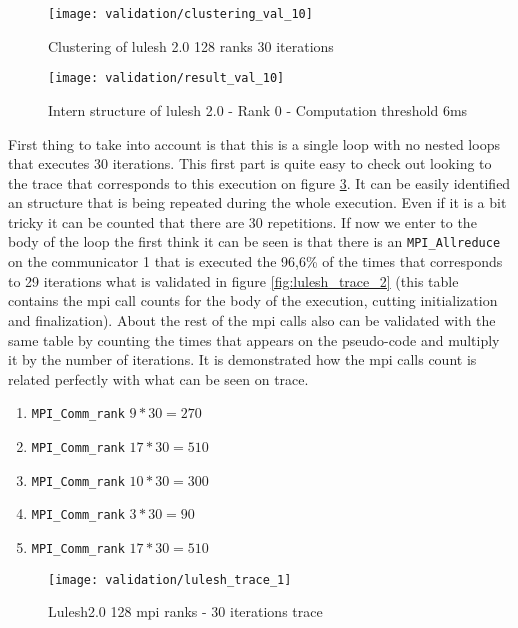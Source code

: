 \begin{figure}
  \centering
  \texttt{[image: validation/clustering\_val\_10]}
  \caption{Clustering of lulesh 2.0 128 ranks 30 iterations}
  \label{fig:clustering_val_10}
\end{figure}

\begin{figure}
    \centering
    \texttt{[image: validation/result\_val\_10]}
    \caption{Intern structure of lulesh 2.0 - Rank 0 - Computation threshold 6ms}
    \label{fig:result_val_10}
\end{figure}

First thing to take into account is that this is a single
loop with no nested loops that executes 30 iterations. This first part is quite
easy to check out looking to the trace that corresponds to this execution on
figure \ref{fig:lulesh_trace_1}. It can be easily identified an structure that
is being repeated during the whole execution. Even if it is a bit tricky it can
be counted that there are 30 repetitions.
If now we enter to the body of the loop the first think it can be seen is that
there is an \texttt{MPI\_Allreduce} on the communicator 1 that is executed the
96,6\% of the times that corresponds to 29 iterations what is validated in
figure \ref{fig:lulesh_trace_2} (this table contains the mpi call counts for the
body of the execution, cutting initialization and finalization). About the rest 
of the mpi calls also can be
validated with the same table by counting the times that appears on the
pseudo-code and multiply it by the number of iterations. It is demonstrated how
the mpi calls count is related perfectly with what can be seen on trace.
\begin{enumerate}[label=\roman*)]
  \item \texttt{MPI\_Comm\_rank} $9*30=270$
  \item \texttt{MPI\_Comm\_rank} $17*30=510$
  \item \texttt{MPI\_Comm\_rank} $10*30=300$
  \item \texttt{MPI\_Comm\_rank} $3*30=90$
  \item \texttt{MPI\_Comm\_rank} $17*30=510$
\end{enumerate}

\begin{figure}
    \centering
    \texttt{[image: validation/lulesh\_trace\_1]}
    \caption{Lulesh2.0 128 mpi ranks - 30 iterations trace}
    \label{fig:lulesh_trace_1}
\end{figure}

